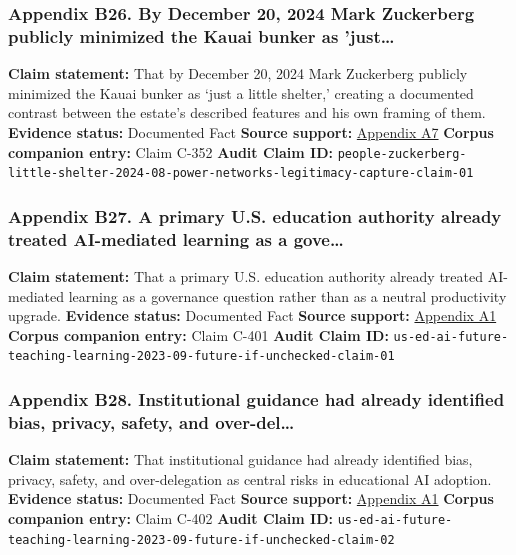 \documentclass[
  american,
  11pt,
  letterpaper,
]{article}
\begin{document}
\subsubsection{Appendix B26. By December 20, 2024 Mark Zuckerberg
publicly minimized the Kauai bunker as
'just\ldots{}}\label{appendix-b26-by-december-20-2024-mark-zuckerberg-publicly-minimized-the-kauai-bunker-as-just}

\textbf{Claim statement:} That by December 20, 2024 Mark Zuckerberg
publicly minimized the Kauai bunker as `just a little shelter,' creating
a documented contrast between the estate's described features and his
own framing of them. \textbf{Evidence status:} Documented Fact
\textbf{Source support:}
\hyperref[appendix-a7-mark-zuckerberg-downplays-his-5-000-square-foot-underground-bunker-in-hawaii-just-a-little-shelter]{Appendix
A7} \textbf{Corpus companion entry:} Claim C-352 \textbf{Audit Claim
ID:}
\texttt{people-zuckerberg-little-shelter-2024-08-power-networks-legitimacy-capture-claim-01}

\subsubsection{Appendix B27. A primary U.S. education authority already
treated AI-mediated learning as a
gove\ldots{}}\label{appendix-b27-a-primary-u-s-education-authority-already-treated-ai-mediated-learning-as-a-gove}

\textbf{Claim statement:} That a primary U.S. education authority
already treated AI-mediated learning as a governance question rather
than as a neutral productivity upgrade. \textbf{Evidence status:}
Documented Fact \textbf{Source support:}
\hyperref[appendix-a1-artificial-intelligence-and-the-future-of-teaching-and-learning-insights-and-recommendations]{Appendix
A1} \textbf{Corpus companion entry:} Claim C-401 \textbf{Audit Claim
ID:}
\texttt{us-ed-ai-future-teaching-learning-2023-09-future-if-unchecked-claim-01}

\subsubsection{Appendix B28. Institutional guidance had already
identified bias, privacy, safety, and
over-del\ldots{}}\label{appendix-b28-institutional-guidance-had-already-identified-bias-privacy-safety-and-over-del}

\textbf{Claim statement:} That institutional guidance had already
identified bias, privacy, safety, and over-delegation as central risks
in educational AI adoption. \textbf{Evidence status:} Documented Fact
\textbf{Source support:}
\hyperref[appendix-a1-artificial-intelligence-and-the-future-of-teaching-and-learning-insights-and-recommendations]{Appendix
A1} \textbf{Corpus companion entry:} Claim C-402 \textbf{Audit Claim
ID:}
\texttt{us-ed-ai-future-teaching-learning-2023-09-future-if-unchecked-claim-02}
\end{document}
